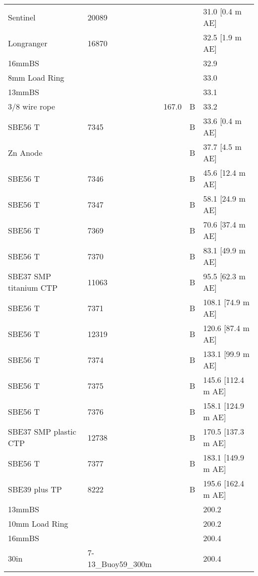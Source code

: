 \documentclass{article}
\begin{document}
\begin{table}[!htbp]
\begin{tabular}{lllll}
Sentinel & 20089 &  &  & 31.0 [0.4 m AE] \\
Longranger & 16870 &  &  & 32.5 [1.9 m AE] \\
16mmBS &  &  &  & 32.9 \\
8mm Load Ring &  &  &  & 33.0 \\
13mmBS &  &  &  & 33.1 \\
3/8 wire rope &  & 167.0 & B & 33.2 \\
SBE56 T & 7345 &  & B & 33.6 [0.4 m AE] \\
Zn Anode &  &  & B & 37.7 [4.5 m AE] \\
SBE56 T & 7346 &  & B & 45.6 [12.4 m AE] \\
SBE56 T & 7347 &  & B & 58.1 [24.9 m AE] \\
SBE56 T & 7369 &  & B & 70.6 [37.4 m AE] \\
SBE56 T & 7370 &  & B & 83.1 [49.9 m AE] \\
SBE37 SMP titanium CTP & 11063 &  & B & 95.5 [62.3 m AE] \\
SBE56 T & 7371 &  & B & 108.1 [74.9 m AE] \\
SBE56 T & 12319 &  & B & 120.6 [87.4 m AE] \\
SBE56 T & 7374 &  & B & 133.1 [99.9 m AE] \\
SBE56 T & 7375 &  & B & 145.6 [112.4 m AE] \\
SBE56 T & 7376 &  & B & 158.1 [124.9 m AE] \\
SBE37 SMP plastic CTP & 12738 &  & B & 170.5 [137.3 m AE] \\
SBE56 T & 7377 &  & B & 183.1 [149.9 m AE] \\
SBE39 plus TP & 8222 &  & B & 195.6 [162.4 m AE] \\
13mmBS &  &  &  & 200.2 \\
10mm Load Ring &  &  &  & 200.2 \\
16mmBS &  &  &  & 200.4 \\
30in & 7-13\_Buoy59\_300m &  &  & 200.4 \\
\bottomrule
\end{tabular}
\end{table}
\end{document}
